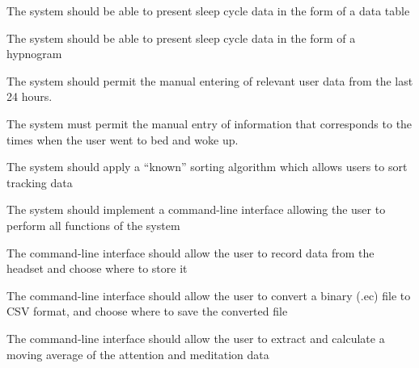 \begin{reqtable}
  {The system should be able to present sleep cycle data in the form of a data table}
  \phigh
  \deps{\ref{req:extract-Data}}

  {The system should be able to present sleep cycle data in the form of a hypnogram}
  \phigh
  \deps{\ref{req:extract-Data}}

  {The system should permit the manual entering of relevant user data from the last 24 hours.}
  \pmed
  \deps{\ref{req:manual-entry-bed-woke}}

  {The system must permit the manual entry of information that corresponds to the times when the
    user went to bed and woke up.}
  \pmed

  {The system should apply a “known” sorting algorithm which allows users to sort tracking data}
  \pmed
  \deps{\ref{req:store-Data}}

  {The system should implement a command-line interface allowing the user to perform all functions of the system}
  \phigh
  \deps{\ref{sreq:allow-user-record-data},\ref{sreq:allow-user-change-format},\ref{sreq:allow-user-extract-calculate}}

  {The command-line interface should allow the user to record data from the headset and choose where to store it}
  \phigh
  \deps{\ref{sreq:read-data-headset},\ref{sreq:facilitate-saving}}

  {The command-line interface should allow the user to convert a binary (.ec) file to CSV format, and choose where to save the converted file}
  \phigh
  \deps{\ref{sreq:facilitate-conversion}}

  {The command-line interface should allow the user to extract and calculate a moving average of the attention and meditation data}
  \pmed
  \deps{\ref{req:extract-Data}}

\end{reqtable}

